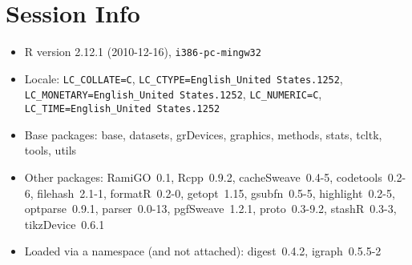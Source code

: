 \documentclass[a4paper,11pt]{article}
\begin{document}
\newpage
\section{Session Info}
\begin{itemize}\raggedright
  \item R version 2.12.1 (2010-12-16), \verb|i386-pc-mingw32|
  \item Locale: \verb|LC_COLLATE=C|, \verb|LC_CTYPE=English_United States.1252|, \verb|LC_MONETARY=English_United States.1252|, \verb|LC_NUMERIC=C|, \verb|LC_TIME=English_United States.1252|
  \item Base packages: base, datasets, grDevices, graphics, methods,
    stats, tcltk, tools, utils
  \item Other packages: RamiGO~0.1, Rcpp~0.9.2, cacheSweave~0.4-5,
    codetools~0.2-6, filehash~2.1-1, formatR~0.2-0, getopt~1.15,
    gsubfn~0.5-5, highlight~0.2-5, optparse~0.9.1, parser~0.0-13,
    pgfSweave~1.2.1, proto~0.3-9.2, stashR~0.3-3, tikzDevice~0.6.1
  \item Loaded via a namespace (and not attached): digest~0.4.2,
    igraph~0.5.5-2
\end{itemize}
\end{document}
